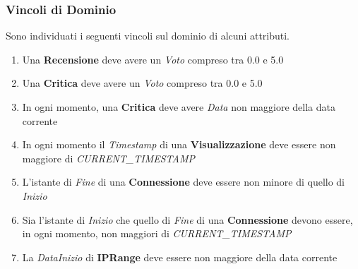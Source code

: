 \documentclass{article}
\begin{document}
\subsubsection{Vincoli di Dominio}
Sono individuati i seguenti vincoli sul dominio di alcuni attributi. \\ 
\begin{enumerate}
\itemsep-0.25em
    \item Una \textbf{Recensione} deve avere un \textit{Voto} compreso tra 0.0 e 5.0
    
    \item Una \textbf{Critica} deve avere un \textit{Voto} compreso tra 0.0 e 5.0
    
    \item In ogni momento, una \textbf{Critica} deve avere \textit{Data} non maggiore della data corrente
    
    \item In ogni momento il \textit{Timestamp} di una \textbf{Visualizzazione} deve essere non maggiore di \textit{CURRENT\_TIMESTAMP}
    
    \item L'istante di \textit{Fine} di una \textbf{Connessione} deve essere non minore di quello di \textit{Inizio}
    
    \item Sia l'istante di \textit{Inizio} che quello di \textit{Fine} di una \textbf{Connessione} devono essere, in ogni momento, non maggiori di \textit{CURRENT\_TIMESTAMP}
    
    \item La \textit{DataInizio} di \textbf{IPRange} deve essere non maggiore della data corrente
\end{enumerate}
\end{document}
